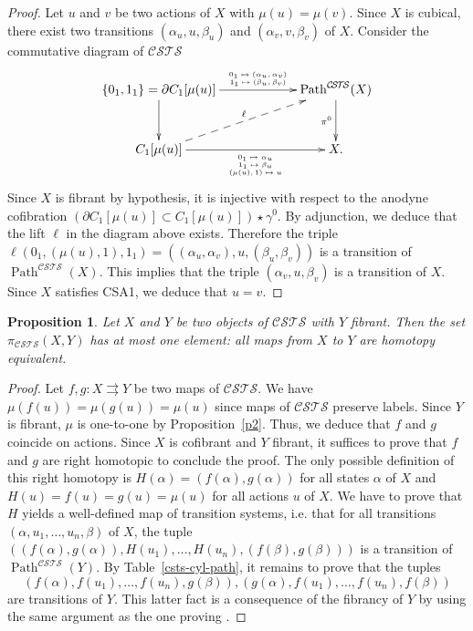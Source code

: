 \documentclass[a4paper,12pt]{amsart}
\newtheorem{prop}[thm]{Proposition}
\begin{document}
\begin{proof} Let $u$ and $v$ be two actions of $X$ with $\mu(u)=\mu(v)$. Since
$X$ is cubical, there exist two transitions $(\alpha_u,u,\beta_u)$ and
$(\alpha_v,v,\beta_v)$ of $X$. Consider the commutative diagram of
${\mathcal{C\!S\!T\!S}}$
\[
\xymatrix@C=6em@R=3em
{
\{0_1,1_1\} = {\partial} C_1[\mu(u)] {\ar@{->}[r]^-{{\hbox{\tiny $\begin{array}{c}0_1\mapsto (\alpha_u,\alpha_v)\\ 1_1\mapsto (\beta_u,\beta_v)\end{array}$}}}} {\ar@{->}[d]_-{{}}} & \operatorname{{Path}}^{\mathcal{C\!S\!T\!S}}(X) {\ar@{->}[d]_-{{\pi^0}}} \\
C_1[\mu(u)] \ar@{-->}[ru]^-{\ell} \ar@{->}[r]_-{\hbox{\tiny $\begin{array}{c}0_1\mapsto \alpha_u\\ 1_1\mapsto \beta_u\\(\mu(u),1) \mapsto u\end{array}$}} & X.
}
\]
Since $X$ is fibrant by hypothesis, it is injective with respect to
the anodyne cofibration $({\partial} C_1[\mu(u)] \subset C_1[\mu(u)])\star
\gamma^0$. By adjunction, we deduce that the lift $\ell$ in the
diagram above exists. Therefore the triple $\ell(0_1,(\mu(u),1),1_1) =
((\alpha_u,\alpha_v),u,(\beta_u,\beta_v))$ is a transition of
$\operatorname{{Path}}^{\mathcal{C\!S\!T\!S}}(X)$. This implies that the triple $(\alpha_v,u,\beta_v)$
is a transition of $X$. Since $X$ satisfies CSA1, we deduce that
$u=v$.  \end{proof}

\begin{prop} \label{p3} Let $X$ and $Y$ be two objects of ${\mathcal{C\!S\!T\!S}}$ with
  $Y$ fibrant. Then the set $\pi_{\mathcal{C\!S\!T\!S}}(X,Y)$ has at most one element:
  all maps from $X$ to $Y$ are homotopy equivalent.
\end{prop}

\begin{proof} Let $f,g:X\rightrightarrows Y$ be two maps of ${\mathcal{C\!S\!T\!S}}$.  We have
$\mu(f(u))=\mu(g(u))=\mu(u)$ since maps of ${\mathcal{C\!S\!T\!S}}$ preserve
labels. Since $Y$ is fibrant, $\mu$ is one-to-one by
Proposition~\ref{p2}. Thus, we deduce that $f$ and $g$ coincide on
actions.  Since $X$ is cofibrant and $Y$ fibrant, it suffices to prove
that $f$ and $g$ are right homotopic to conclude the proof.  The only
possible definition of this right homotopy is
$H(\alpha)=(f(\alpha),g(\alpha))$ for all states $\alpha$ of $X$ and
$H(u)=f(u)=g(u)=\mu(u)$ for all actions $u$ of $X$.  We have to prove
that $H$ yields a well-defined map of transition systems, i.e. that
for all transitions $(\alpha,u_1,\dots,u_n,\beta)$ of $X$, the tuple
$((f(\alpha),g(\alpha)),H(u_1),\dots,H(u_n),(f(\beta),g(\beta)))$ is a
transition of $\operatorname{{Path}}^{\mathcal{C\!S\!T\!S}}(Y)$. By Table~\ref{csts-cyl-path}, it
remains to prove that the tuples
\[(f(\alpha),f(u_1),\dots,f(u_n),g(\beta)), (g(\alpha),f(u_1),\dots,f(u_n),f(\beta))\]
are transitions of $Y$. This latter fact is a consequence of the
fibrancy of $Y$ by using the same argument as the one proving
\cite[Theorem~4.2]{biscsts1}.  \end{proof}
\end{document}
